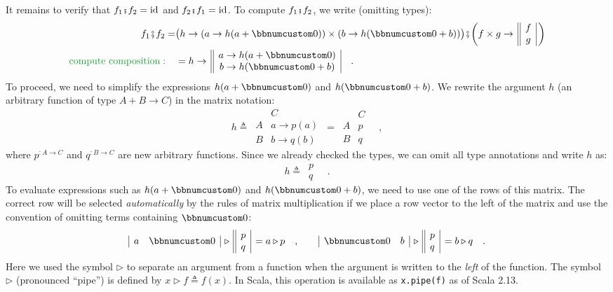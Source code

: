It remains to verify that $f_{1}\bef f_{2}=\text{id}$ and $f_{2}\bef f_{1}=\text{id}$.
To compute $f_{1}\bef f_{2}$, we write (omitting types):
\begin{align*}
f_{1}\bef f_{2}= & \big(h\rightarrow(a\rightarrow h(a+\bbnum 0))\times(b\rightarrow h(\bbnum 0+b))\big)\bef\bigg(f\times g\rightarrow\,\begin{array}{||c|}
f\\
g
\end{array}\,\bigg)\\
{\color{greenunder}\text{compute composition}:}\quad & =h\rightarrow\,\begin{array}{||c|}
a\rightarrow h(a+\bbnum 0)\\
b\rightarrow h(\bbnum 0+b)
\end{array}\quad.
\end{align*}
To proceed, we need to simplify the expressions $h(a+\bbnum 0)$ and
$h(\bbnum 0+b)$. We rewrite the argument $h$ (an arbitrary function
of type $A+B\rightarrow C$) in the matrix notation:
\[
h\triangleq\,\begin{array}{|c||c|}
 & C\\
\hline A & a\rightarrow p(a)\\
B & b\rightarrow q(b)
\end{array}\,=\,\begin{array}{|c||c|}
 & C\\
\hline A & p\\
B & q
\end{array}\quad,
\]
where $p^{:A\rightarrow C}$ and $q^{:B\rightarrow C}$ are new arbitrary
functions. Since we already checked the types, we can omit all type
annotations and write $h$ as:
\[
h\triangleq\,\begin{array}{||c|}
p\\
q
\end{array}\quad.
\]
To evaluate expressions such as $h(a+\bbnum 0)$ and $h(\bbnum 0+b)$,
we need to use one of the rows of this matrix. The correct row will
be selected \emph{automatically} by the rules of matrix multiplication
if we place a row vector to the left of the matrix and use the convention
of omitting terms containing $\bbnum 0$:
\[
\begin{array}{|cc|}
a & \bbnum 0\end{array}\,\triangleright\,\begin{array}{||c|}
p\\
q
\end{array}\,=a\triangleright p\quad,\quad\quad\begin{array}{|cc|}
\bbnum 0 & b\end{array}\,\triangleright\,\begin{array}{||c|}
p\\
q
\end{array}\,=b\triangleright q\quad.
\]
Here we used the symbol $\triangleright$ to separate an argument
from a function when the argument is written to the \emph{left} of
the function. The symbol $\triangleright$ (pronounced \textsf{``}pipe\textsf{''})
is defined by $x\triangleright f\triangleq f(x)$. In Scala, this
operation is available as \lstinline!x.pipe(f)! as of Scala 2.13.

